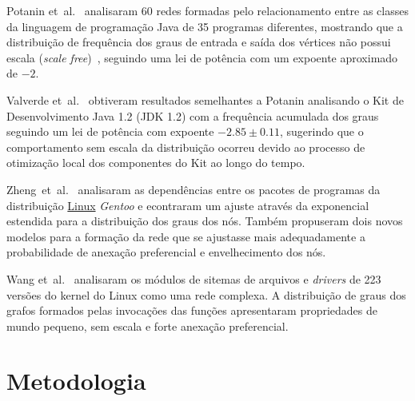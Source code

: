 \documentclass[a4paper,12pt,twoside]{article}
\def\linux{\href{http://www.kernel.org/}{\sc Linux}}
\def\etal{{et~al.}}
\begin{document}
Potanin \etal~\cite{potanin:oop_scale_free} analisaram 60 redes
formadas pelo relacionamento entre as classes da linguagem de
programação Java de 35 programas diferentes, mostrando que a
distribuição de frequência dos graus de entrada e saída dos vértices
não possui escala ({\em scale free})~\cite{barabasi-science-2009},
seguindo uma lei de potência com um expoente aproximado de $-2$.

Valverde \etal~\cite{valverde-2002} obtiveram resultados semelhantes a
Potanin analisando o Kit de Desenvolvimento Java 1.2 (JDK 1.2) com a
frequência acumulada dos graus seguindo um lei de potência com
expoente $-2.85\pm 0.11$, sugerindo que o comportamento sem escala
da distribuição ocorreu devido ao processo de otimização local dos
componentes do Kit ao longo do tempo.

Zheng~\etal~\cite{zheng2008} analisaram as dependências entre os
pacotes de programas da distribuição \linux{} \textit{Gentoo} e
econtraram um ajuste através da exponencial estendida para a
distribuição dos graus dos nós. Também propuseram dois novos modelos
para a formação da rede que se ajustasse mais adequadamente a
probabilidade de anexação preferencial e envelhecimento dos nós.

Wang \etal~\cite{wang2009} analisaram os módulos de sitemas de
arquivos e \textit{drivers} de 223 versões do kernel do Linux como uma
rede complexa. A distribuição de graus dos grafos formados pelas
invocações das funções apresentaram propriedades de mundo pequeno,
sem escala e forte anexação preferencial. 



\section{Metodologia}
\label{s:metodologia}
\end{document}
